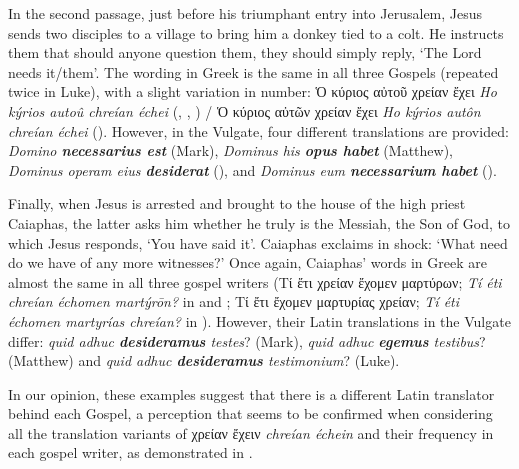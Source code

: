 \documentclass[output=paper,colorlinks,citecolor=brown]{langscibook}
\begin{document}
In the second passage, just before his triumphant entry into Jerusalem, Jesus sends two
disciples to a village to bring him a donkey tied to a colt. He instructs them that should
anyone question them, they should simply reply, `The Lord needs it/them'. The wording in
Greek is the same in all three Gospels (repeated twice in Luke), with a slight variation
in number: Ὁ κύριος αὐτοῦ χρείαν ἔχει \emph{Ho kýrios autoû chreían échei} (, , ) / Ὁ κύριος αὐτῶν χρείαν ἔχει \emph{Ho kýrios autôn chreían échei} (). However, in the Vulgate, four different translations are provided: \emph{Domino
  \textbf{necessarius est}} (Mark), \emph{Dominus his \textbf{opus habet}} (Matthew),
\emph{Dominus operam eius \textbf{desiderat}} (), and \emph{Dominus eum
  \textbf{necessarium habet}} ().


Finally, when Jesus is arrested and brought to the house of the high priest Caiaphas, the
latter asks him whether he truly is the Messiah, the Son of God, to which Jesus responds,
`You have said it'. Caiaphas exclaims in shock: `What need do we have of any more
witnesses?' Once again, Caiaphas' words in Greek are almost the same in all three gospel
writers (Τί ἔτι χρείαν ἔχομεν μαρτύρων; \emph{Tí éti chreían échomen martýrōn?} in  and ; Τί ἔτι ἔχομεν μαρτυρίας χρείαν; \emph{Tí éti échomen martyrías
  chreían?} in ). However, their Latin translations in the Vulgate differ:
\emph{quid adhuc \textbf{desideramus} testes}? (Mark), \emph{quid adhuc \textbf{egemus}
  testibus}? (Matthew) and \emph{quid adhuc \textbf{desideramus} testimonium}? (Luke).


In our opinion, these examples suggest that there is a different Latin translator behind
each Gospel, a perception that seems to be confirmed when considering all the translation
variants of χρείαν ἔχειν \emph{chreían échein} and their frequency in each gospel writer, as demonstrated in
.
\end{document}
